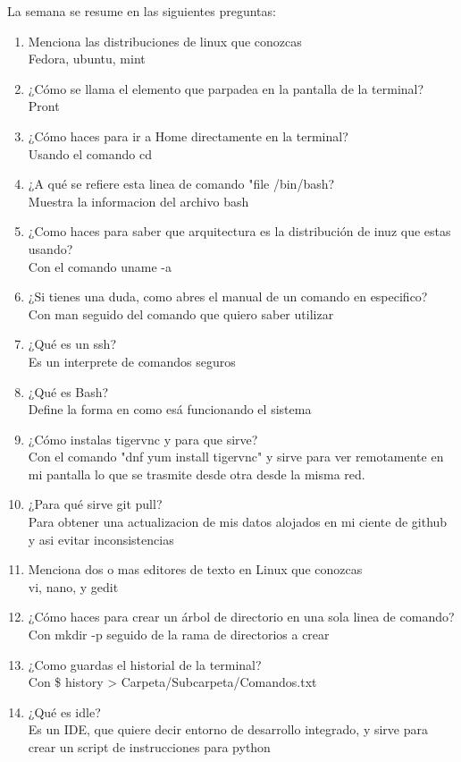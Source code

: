 \documentclass[letterpaper, 12pt, oneside]{article}%
\begin{document}
La semana se resume en las siguientes preguntas:%
\begin{enumerate}%
	\item Menciona las distribuciones de linux que conozcas \\
	 Fedora, ubuntu, mint	
	
	\item ¿Cómo se llama el elemento que parpadea en la pantalla de la terminal?\\
	Pront
	\item ¿Cómo haces para ir a Home directamente en la terminal?\\
	Usando el comando cd
	\item ¿A qué se refiere esta linea de comando "file /bin/bash?\\
	Muestra la informacion del archivo bash
	\item ¿Como haces para saber que arquitectura es la distribución de inuz que estas usando?\\
	Con el comando uname -a
	\item ¿Si tienes una duda, como abres el manual de un comando en especifico?\\
	Con man seguido del comando que quiero saber utilizar
	\item ¿Qué es un ssh?\\
	Es un interprete de comandos seguros
	\item ¿Qué es Bash?\\
	Define la forma en como esá funcionando el sistema
	
	\item ¿Cómo instalas tigervnc y para que sirve?\\
	Con el comando "dnf yum install tigervnc" y sirve para ver remotamente en mi pantalla lo que se trasmite desde otra desde la misma red.
	\item ¿Para qué sirve git pull?\\
	Para obtener una actualizacion de mis datos alojados en mi ciente de github y asi evitar inconsistencias
	
	\item Menciona dos o mas editores de texto en Linux que conozcas\\
	vi, nano, y gedit
	\item ¿Cómo haces para crear un árbol de directorio en una sola linea de comando?\\
	Con mkdir -p seguido de la rama de directorios a crear
	\item ¿Como guardas el historial de la terminal?\\
	Con \$ history > Carpeta/Subcarpeta/Comandos.txt
	\item ¿Qué es idle?\\
	Es un IDE, que quiere decir entorno de desarrollo integrado, y sirve para crear un script de instrucciones para python
	

\end{enumerate}
\end{document}
